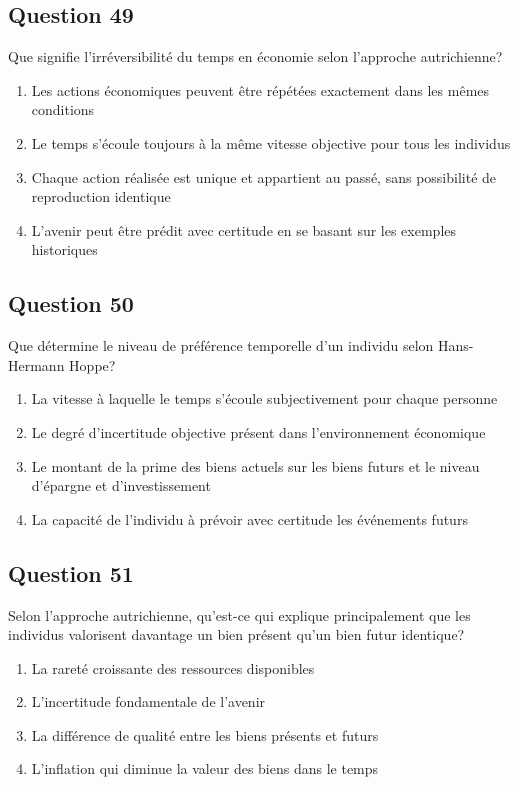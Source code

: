 \documentclass[12pt,a4paper]{article}
\begin{document}
\bigskip


\subsection*{Question 49}
Que signifie l'irréversibilité du temps en économie selon l'approche autrichienne?

\begin{enumerate}[label=\Alph*., leftmargin=*]
\item Les actions économiques peuvent être répétées exactement dans les mêmes conditions
\item Le temps s'écoule toujours à la même vitesse objective pour tous les individus
\item Chaque action réalisée est unique et appartient au passé, sans possibilité de reproduction identique
\item L'avenir peut être prédit avec certitude en se basant sur les exemples historiques
\end{enumerate}

\bigskip


\subsection*{Question 50}
Que détermine le niveau de préférence temporelle d'un individu selon Hans-Hermann Hoppe?

\begin{enumerate}[label=\Alph*., leftmargin=*]
\item La vitesse à laquelle le temps s'écoule subjectivement pour chaque personne
\item Le degré d'incertitude objective présent dans l'environnement économique
\item Le montant de la prime des biens actuels sur les biens futurs et le niveau d'épargne et d'investissement
\item La capacité de l'individu à prévoir avec certitude les événements futurs
\end{enumerate}

\bigskip


\subsection*{Question 51}
Selon l'approche autrichienne, qu'est-ce qui explique principalement que les individus valorisent davantage un bien présent qu'un bien futur identique?

\begin{enumerate}[label=\Alph*., leftmargin=*]
\item La rareté croissante des ressources disponibles
\item L'incertitude fondamentale de l'avenir
\item La différence de qualité entre les biens présents et futurs
\item L'inflation qui diminue la valeur des biens dans le temps
\end{enumerate}
\end{document}
